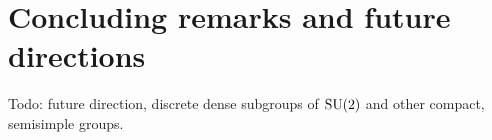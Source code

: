 
\chapter{Concluding remarks and future directions}

Todo: future direction, discrete dense subgroups of $\operatorname{SU}(2)$ and other 
compact, semisimple groups. 
